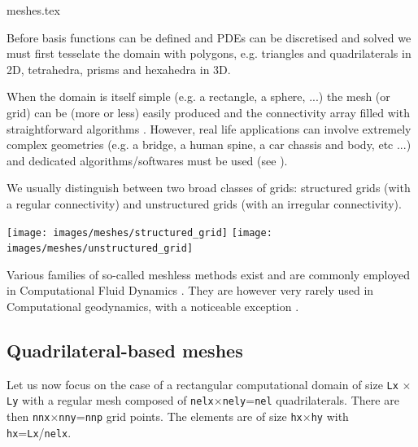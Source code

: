 \begin{flushright} {\tiny {\color{gray} meshes.tex}} \end{flushright}

Before basis functions can be defined and PDEs can be discretised and solved 
we must first tesselate the domain with polygons, e.g. triangles and 
quadrilaterals in 2D, tetrahedra, prisms and hexahedra in 3D.  

When the domain is itself simple (e.g. a rectangle, a sphere, ...) the mesh (or grid) can 
be (more or less) easily produced and the connectivity array filled with straightforward 
algorithms \cite{thie18}.
However, real life applications can involve extremely complex geometries (e.g. a bridge, 
a human spine, a car chassis and body, etc ...) and dedicated algorithms/softwares 
must be used (see \cite{thsw,frge,xiyz09,koko15}). 

We usually distinguish between two broad classes of grids: structured grids (with a regular 
connectivity) and unstructured grids (with an irregular connectivity).
 

\begin{center}
\texttt{[image: images/meshes/structured\_grid]}
\texttt{[image: images/meshes/unstructured\_grid]}
\end{center}

\begin{remark}
Various families of so-called meshless methods exist and are commonly employed in Computational 
Fluid Dynamics \cite{liugu,liliu,grliu,liuliu}. They are however very rarely used in 
Computational geodynamics, with a noticeable exception \cite{hans03}.
\end{remark}

\subsection{Quadrilateral-based meshes}

Let us now focus on the case of a rectangular computational domain of size 
{\tt Lx} $\times$ {\tt Ly} with a regular mesh composed of {\tt nelx}$\times${\tt nely}={\tt nel}
   quadrilaterals.  
There are then {\tt nnx}$\times${\tt nny}={\tt nnp} grid points.
The elements are of size {\tt hx}$\times${\tt hy} with {\tt hx}={\tt Lx}/{\tt nelx}.

